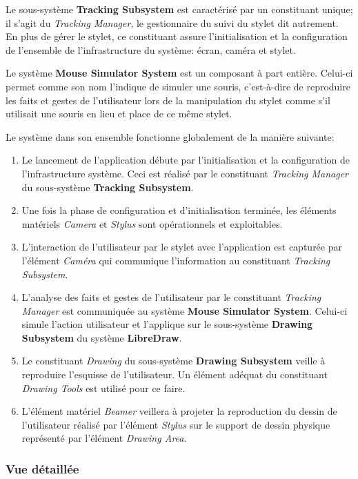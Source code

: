 \documentclass[11pt,a4paper,oldfontcommands]{memoir}
\begin{document}
Le sous-système \textbf{Tracking Subsystem} est caractérisé par un constituant unique; il s'agit du \textit{Tracking Manager}, le gestionnaire du suivi du stylet dit autrement. En plus de gérer le stylet, ce constituant assure l'initialisation et la configuration de l'ensemble de l'infrastructure du système: écran, caméra et stylet.

Le système \textbf{Mouse Simulator System} est un composant à part entière. Celui-ci permet comme son nom l'indique de simuler une souris, c'est-à-dire de reproduire les faits et gestes de l'utilisateur lors de la manipulation du stylet comme s'il utilisait une souris en lieu et place de ce même stylet.

Le système dans son ensemble fonctionne globalement de la manière suivante:

\begin{enumerate}
\item Le lancement de l'application débute par l'initialisation et la configuration de l'infrastructure système. Ceci est réalisé par le constituant \textit{Tracking Manager} du sous-système \textbf{Tracking Subsystem}.
\item Une fois la phase de configuration et d'initialisation terminée, les éléments matériels \textit{Camera} et \textit{Stylus} sont opérationnels et exploitables.
\item L'interaction de l'utilisateur par le stylet avec l'application est capturée par l'élément \textit{Caméra} qui communique l'information au constituant \textit{Tracking Subsystem}.
\item L'analyse des faits et gestes de l'utilisateur par le constituant \textit{Tracking Manager} est communiquée au système \textbf{Mouse Simulator System}. Celui-ci simule l'action utilisateur et l'applique sur le sous-système \textbf{Drawing Subsystem} du système \textbf{LibreDraw}.
\item Le constituant \textit{Drawing} du sous-système \textbf{Drawing Subsystem} veille à reproduire l'esquisse de l'utilisateur. Un élément adéquat du constituant \textit{Drawing Tools} est utilisé pour ce faire.
\item L'élément matériel \textit{Beamer} veillera à projeter la reproduction du dessin de l'utilisateur réalisé par l'élément \textit{Stylus} sur le support de dessin physique représenté par l'élément \textit{Drawing Area}.
\end{enumerate}

\newpage

\subsubsection{Vue détaillée}
\end{document}
